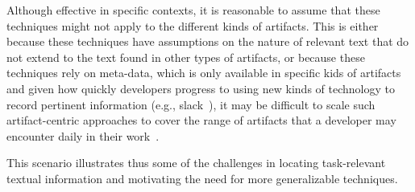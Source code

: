  
 
 
 Although effective in specific contexts,
 it is reasonable to assume that these techniques might not apply 
 to the different kinds of artifacts. This is either because these techniques have  assumptions on the nature of relevant text that do
 not extend to the text found in other types of artifacts, or 
 because these techniques rely on 
 meta-data, which is only available in specific kids of artifacts
 and given how quickly developers progress to using new kinds of technology to
 record pertinent information (e.g., slack~\cite{Storey2017, Lin2016}),
 it may be difficult to scale such artifact-centric approaches to cover the range of
 artifacts that 
 a developer may encounter
 daily in their work~\cite{Li2013}.
 
 
 This scenario illustrates thus some of the challenges in locating task-relevant textual
 information and motivating the need for more generalizable techniques.
 
 





























